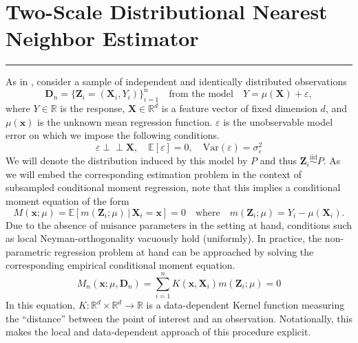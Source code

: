\documentclass[letterpaper,10pt]{article}
\numberwithin{equation}{section}
\numberwithin{thm}{section}
\numberwithin{lem}{section}
\numberwithin{cor}{section}
\newcommand{\E}{\mathbb{E}}
\newcommand{\1}{\mathbbm{1}}
\newcommand{\Var}{\text{Var}}
\newcommand{\indep}{\perp\!\!\!\!\perp}
\begin{document}
\section{Two-Scale Distributional Nearest Neighbor Estimator}\label{sec:TDNN}
\hrule
As in \citet{demirkaya_optimal_2024}, consider a sample of independent and identically distributed observations
\begin{equation}\label{DGP}
	\mathbf{D}_n = \{\mathbf{Z}_i = (\mathbf{X}_i, Y_i)\}_{i = 1}^{n}
	\quad \text{from the model} \quad
	Y = \mu(\mathbf{X}) + \varepsilon,
\end{equation}
where $Y \in \mathbb{R}$ is the response, $\mathbf{X} \in \mathbb{R}^d$ is a feature vector of fixed dimension $d$, and $\mu(\mathbf{x})$ is the unknown mean regression function.
$\varepsilon$ is the unobservable model error on which we impose the following conditions.
\begin{equation}
	\varepsilon \indep \mathbf{X}, \quad
	\E\left[\varepsilon\right] = 0, \quad
	\Var\left(\varepsilon\right) = \sigma_{\varepsilon}^2
\end{equation}
We will denote the distribution induced by this model by $P$ and thus $\mathbf{Z}_i \overset{\text{iid}}{\sim} P$.
As we will embed the corresponding estimation problem in the context of subsampled conditional moment regression, note that this implies a conditional moment equation of the form
\begin{equation}\label{CondMomEq}
	M(\mathbf{x}; \mu)
	= \E\left[m(\mathbf{Z}_i; \mu) \, | \, \mathbf{X}_i = \mathbf{x}\right]
	= 0
	\quad \text{where} \quad
	m(\mathbf{Z}_i; \mu) = Y_i - \mu(\mathbf{X}_i).
\end{equation}
Due to the absence of nuisance parameters in the setting at hand, conditions such as local Neyman-orthogonality vacuously hold (uniformly).
In practice, the non-parametric regression problem at hand can be approached by solving the corresponding empirical conditional moment equation.
\begin{equation}\label{EmpCondMomEq}
	M_n(\mathbf{x}; \mu, \mathbf{D}_n)
	= \sum_{i = 1}^{n}K(\mathbf{x}, \mathbf{X}_i)m(\mathbf{Z}_i; \mu)
	= 0
\end{equation}
In this equation, $K:\mathbb{R}^d \times \mathbb{R}^d \rightarrow \mathbb{R}$ is a data-dependent Kernel function measuring the ``distance'' between the point of interest and an observation.
Notationally, this makes the local and data-dependent approach of this procedure explicit.
\end{document}
